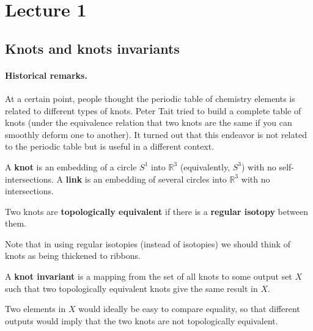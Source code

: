 \section{Lecture 1}


\subsection{Knots and knots invariants}

\paragraph{Historical remarks.} At a certain point, people thought the periodic table of chemistry elements is related to different types of knots. Peter Tait tried to build a complete table of knots (under the equivalence relation that two knots are the same if you can smoothly deform one to another). It turned out that this endeavor is not related to the periodic table but is useful in a different context.


\begin{definition}
  A \textbf{knot} is an embedding of a circle $S^1$ into $\mathbb{R}^3$ (equivalently, $S^3$) with no self-intersections. A \textbf{link} is an embedding of several circles into $\mathbb{R}^3$ with no intersections.   
\end{definition}

\begin{definition}
  Two knots are \textbf{topologically equivalent} if there is a \textbf{regular isotopy} between them.
\end{definition}


\begin{remark}
    Note that in using regular isotopies (instead of isotopies) we should think of knots as being thickened to ribbons.
\end{remark}


\begin{definition}
  A \textbf{knot invariant} is a mapping from the set of all knots to some output set $X$ such that two topologically equivalent knots give the same result in $X$. 
\end{definition}

\begin{remark}
    Two elements in $X$ would ideally be easy to compare equality, so that different outputs would imply that the two knots are not topologically equivalent. 
\end{remark}

